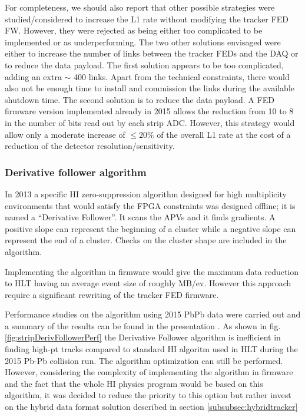 For completeness, we should also report that other possible strategies were studied/considered to increase the L1 rate
without modifying the tracker FED FW. However, they were rejected as being either too complicated to be implemented or
as underperforming. The two other solutions envisaged were either to increase the number of links between the tracker
FEDs and the DAQ or to reduce the data payload. The first solution appears to be too complicated, adding an extra $\sim$
400 links. Apart from the technical constraints, there would also not be enough time to install and commission the
links during the available shutdown time. The second solution is to reduce the data payload. A FED firmware version
implemented already in 2015 allows the reduction from 10 to 8 in the number of bits read out by each strip ADC. However,
this strategy would allow only a moderate increase of $\le 20 \%$ of the overall L1 rate at the cost of a reduction of
the detector resolution/sensitivity. 

\subsubsection{Derivative follower algorithm \label{subsubsec:DerFollower}}
In 2013 a specific HI zero-suppression algorithm designed for high multiplicity environments that would satisfy the FPGA
constraints was designed offline; it is named a ``Derivative Follower''. It scans the APVs and it finds gradients. A positive slope can represent the beginning of a cluster while a negative slope can represent the end of a cluster. Checks on the cluster shape are included in the algorithm. 

Implementing the algorithm in firmware would give the maximum data reduction to HLT having an average event size of roughly MB/ev. However this approach require a significant rewriting of the tracker FED firmware. 


Performance studies on the algorithm using 2015 PbPb data were carried out and a summary of the results can be found in the presentation \cite{stripDerFollPerf}. As shown in fig. \ref{fig:stripDerivFollowerPerf}
the Derivative Follower algorithm is inefficient in finding high-pt tracks compared to standard HI algoritm used in HLT during the 2015 Pb-Pb collision run. The algorithm optimization can still be performed. However, considering the complexity of implementing the algorithm in firmware and the fact that the whole HI physics program would be based on this algorithm, it was decided to reduce the priority to this option but rather invest on the hybrid data format solution described in section \ref{subsubsec:hybridtracker}

